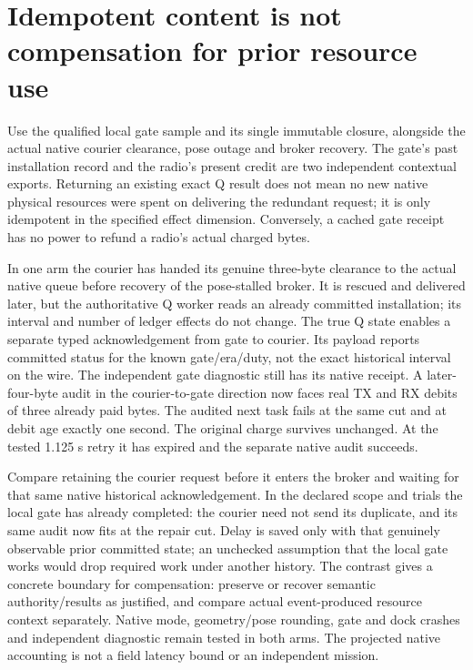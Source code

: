 \documentclass{article}
\begin{document}
\section*{Idempotent content is not compensation for prior resource use}
Use the qualified local gate sample and its single immutable closure,
alongside the actual native courier clearance, pose outage and broker
recovery. The gate's past installation record and the radio's present
credit are two independent contextual exports. Returning an existing
exact Q result does not mean no new native physical resources were
spent on delivering the redundant request; it is only idempotent in
the specified effect dimension. Conversely, a cached gate receipt has
no power to refund a radio's actual charged bytes.

In one arm the courier has handed its genuine three-byte clearance
to the actual native queue before recovery of the pose-stalled
broker. It is rescued and delivered later, but the authoritative Q
worker reads an already committed installation; its interval and
number of ledger effects do not change. The true Q state enables a
separate typed acknowledgement from gate to courier. Its payload
reports committed status for the known gate/era/duty, not the exact
historical interval on the wire. The independent gate diagnostic still
has its native receipt. A later-four-byte audit in the courier-to-gate
direction now faces real TX and RX debits of three already paid bytes.
The audited next task fails at the same cut and at debit age exactly
one second. The original charge survives unchanged. At the tested
1.125 s retry it has expired and the separate native audit succeeds.

Compare retaining the courier request before it enters the broker
and waiting for that same native historical acknowledgement. In
the declared scope and trials the local gate has already completed:
the courier need not send its duplicate, and its same audit now
fits at the repair cut. Delay is saved only with that genuinely
observable prior committed state; an unchecked assumption that the
local gate works would drop required work under another history.
The contrast gives a concrete boundary for compensation: preserve
or recover semantic authority/results as justified, and compare
actual event-produced resource context separately. Native mode,
geometry/pose rounding, gate and dock crashes and independent
diagnostic remain tested in both arms. The projected native
accounting is not a field latency bound or an independent mission.
\end{document}
